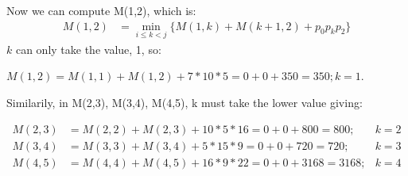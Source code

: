 \documentclass[12pt]{article}
\begin{document}
Now we can compute M(1,2), which is:
\begin{align*}
M(1,2) & =  \min_{i \leq k < j} \{ M(1,k) + M(k+1,2) + p_{0}p_{k}p_{2} \} 
\end{align*}
$k$ can only take the value, 1, so:\\
\centerline{$M(1,2) = M(1,1) + M(1,2) + 7* 10 *  5 = 0 + 0 + 350 = 350; k = 1$.}

Similarily, in M(2,3), M(3,4), M(4,5), k must take the lower value giving:

\begin{align*}
M(2,3) & = M(2,2) + M(2,3) + 10 *5 * 16 = 0 + 0 + 800 = 800; &k=2  \\
M(3,4) & = M(3,3) + M(3,4) + 5  * 15 * 9 = 0 + 0 + 720 = 720; &k =3 \\
M(4,5) & = M(4,4) + M(4,5) + 16* 9 * 22 = 0 + 0 + 3168 = 3168; &k =4\\
\end{align*}
\end{document}
